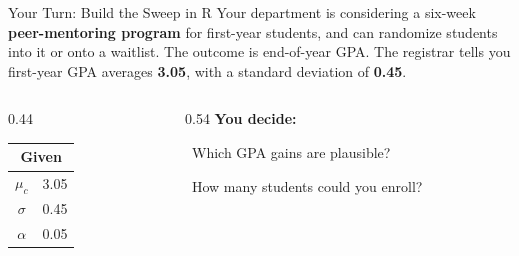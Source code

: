 \documentclass[
  ignorenonframetext,
  aspectratio=169,
]{beamer}
\begin{document}
\begin{frame}{Your Turn: Build the Sweep in R}
\label{your-turn-build-the-sweep-in-r}
\small Your department is considering a six-week \textbf{peer-mentoring
program} for first-year students, and can randomize students into it or
onto a waitlist. The outcome is end-of-year GPA. The registrar tells you
first-year GPA averages \textbf{3.05}, with a standard deviation of
\textbf{0.45}.

\vspace{0.5em}

\begin{columns}[T]
\begin{column}{0.44\textwidth}
\begin{center}
\footnotesize
\setlength{\tabcolsep}{6pt}
\renewcommand{\arraystretch}{1.25}
\begin{tabular}{cc}
\toprule
\multicolumn{2}{c}{\textbf{Given}} \\
\midrule
$\mu_c$  & 3.05 \\
$\sigma$ & 0.45 \\
$\alpha$ & 0.05 \\
\bottomrule
\end{tabular}
\end{center}
\end{column}

\begin{column}{0.54\textwidth}
\vspace{0.4em}
\footnotesize
\textbf{You decide:}

\vspace{0.3em}

\hspace{0.4em}\textbullet~Which GPA gains are plausible?

\vspace{0.2em}

\hspace{0.4em}\textbullet~How many students could you enroll?
\end{column}
\end{columns}

\vspace{0.4em}
\end{frame}
\end{document}
